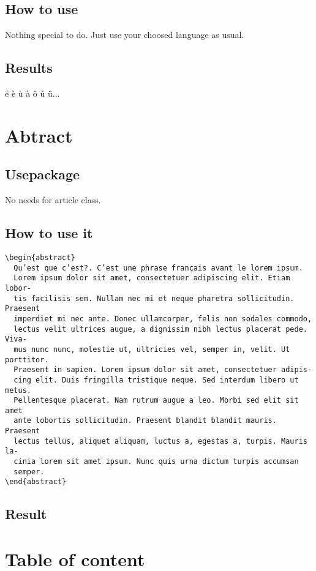 \documentclass[a4paper,12pt]{article}
\begin{document}
\subsection{How to use}
Nothing special to do. Just use your choosed language as usual.
\subsection{Results}
é è ù à ô û ü...
\newpage
\section{Abtract}
\subsection{Usepackage}
No needs for article class.
\subsection{How to use it}
\begin{verbatim}
\begin{abstract}
  Qu’est que c’est?. C’est une phrase français avant le lorem ipsum.
  Lorem ipsum dolor sit amet, consectetuer adipiscing elit. Etiam lobor-
  tis facilisis sem. Nullam nec mi et neque pharetra sollicitudin. Praesent
  imperdiet mi nec ante. Donec ullamcorper, felis non sodales commodo,
  lectus velit ultrices augue, a dignissim nibh lectus placerat pede. Viva-
  mus nunc nunc, molestie ut, ultricies vel, semper in, velit. Ut porttitor.
  Praesent in sapien. Lorem ipsum dolor sit amet, consectetuer adipis-
  cing elit. Duis fringilla tristique neque. Sed interdum libero ut metus.
  Pellentesque placerat. Nam rutrum augue a leo. Morbi sed elit sit amet
  ante lobortis sollicitudin. Praesent blandit blandit mauris. Praesent
  lectus tellus, aliquet aliquam, luctus a, egestas a, turpis. Mauris la-
  cinia lorem sit amet ipsum. Nunc quis urna dictum turpis accumsan
  semper.
\end{abstract}
\end{verbatim}
\subsection{Result}

\begin{abstract}
\blindtext
\end{abstract}

\newpage
\section{Table of content}
\end{document}
